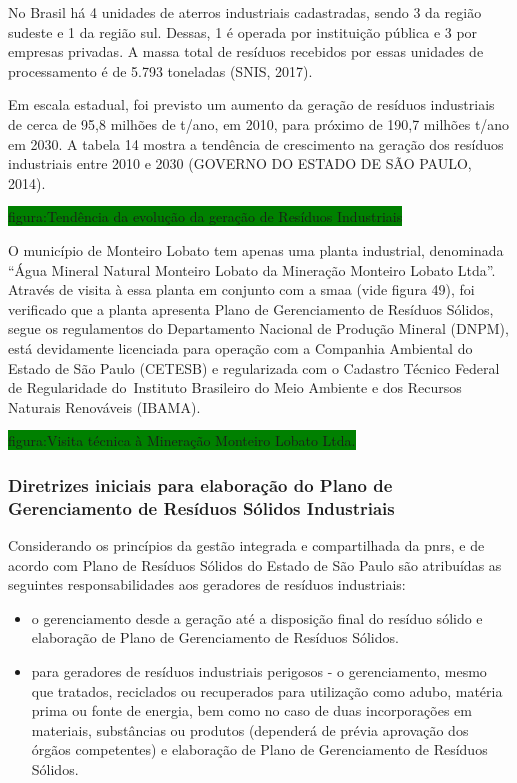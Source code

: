 	No Brasil há 4 unidades de aterros industriais cadastradas, sendo 3 da região sudeste e 1 da região sul. Dessas, 1 é operada por instituição pública e 3 por empresas privadas. A massa total de resíduos recebidos por essas unidades de processamento é de 5.793 toneladas (SNIS, 2017).
	
	Em escala estadual, foi previsto um aumento da geração de resíduos industriais de cerca de 95,8 milhões de t/ano, em 2010, para próximo de 190,7 milhões t/ano em 2030. A tabela 14 mostra a tendência de crescimento na geração dos resíduos industriais entre 2010 e 2030 (GOVERNO DO ESTADO DE SÃO PAULO, 2014).
	
	\colorbox{green}{figura:Tendência da evolução da geração de Resíduos Industriais}
	
	O município de Monteiro Lobato tem apenas uma planta industrial, denominada “Água Mineral Natural Monteiro Lobato da Mineração Monteiro Lobato Ltda”. Através de visita à essa planta em conjunto com a \gls{smaa} (vide figura 49), foi verificado que a planta apresenta Plano de Gerenciamento de Resíduos Sólidos, segue os regulamentos do Departamento Nacional de Produção Mineral (DNPM), está devidamente licenciada para operação com a Companhia Ambiental do Estado de São Paulo (CETESB) e regularizada com o Cadastro Técnico Federal de Regularidade do Instituto Brasileiro do Meio Ambiente e dos Recursos Naturais Renováveis (IBAMA).
	
	\colorbox{green}{figura:Visita técnica à Mineração Monteiro Lobato Ltda.}
	
	\subsubsection{Diretrizes iniciais para elaboração do Plano de Gerenciamento de Resíduos Sólidos Industriais}
	
	Considerando os princípios da gestão integrada e compartilhada da \gls{pnrs}, e de acordo com Plano de Resíduos Sólidos do Estado de São Paulo são atribuídas as seguintes responsabilidades aos geradores de resíduos industriais:
	
	\begin{itemize}
		\item o gerenciamento desde a geração até a disposição final do resíduo sólido e elaboração de Plano de Gerenciamento de Resíduos Sólidos.
		\item para geradores de resíduos industriais perigosos - o gerenciamento, mesmo que tratados, reciclados ou recuperados para utilização como adubo, matéria prima ou fonte de energia, bem como no caso de duas incorporações em materiais, substâncias ou produtos (dependerá de prévia aprovação dos órgãos competentes) e elaboração de Plano de Gerenciamento de Resíduos Sólidos.
	\end{itemize}

